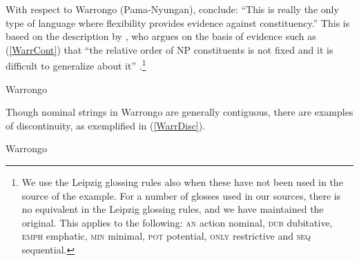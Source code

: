 \documentclass[output=paper,hidelinks]{langscibook}
\begin{document}
With respect to Warrongo (Pama-Nyungan), \citet[35]{LouaVers16} conclude: ``This is really the only type of language where flexibility provides evidence against constituency.'' This is based on the description by \citeauthor{Tsunoda11}, who argues on the basis of evidence such as (\ref{WarrCont}) that ``the relative order of NP constituents is not fixed and it is difficult to generalize about it'' \citeyearpar[347]{Tsunoda11}.\footnote{We
    use the Leipzig glossing rules also when these have not been used in the source of the example. For a number of glosses used in our sources, there is no equivalent in the Leipzig glossing rules, and we have maintained the original. This applies to the following: \textsc{an} action nominal, \textsc{dub} dubitative, \textsc{emph} emphatic, \textsc{min} minimal, \textsc{pot} potential, \textsc{only} restrictive and \textsc{seq} sequential.
}


\eal\label{WarrCont} Warrongo 
\zl

Though nominal strings in Warrongo are generally contiguous, there are examples of discontinuity, as exemplified in (\ref{WarrDisc}).

\eal\label{WarrDisc} Warrongo
\zl
\end{document}
